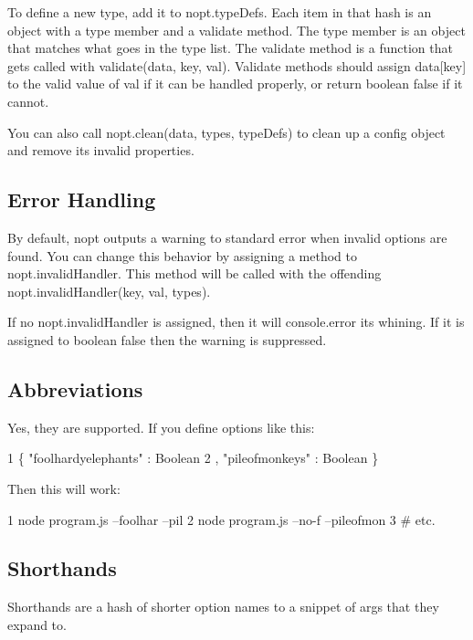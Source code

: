 To define a new type, add it to {\ttfamily nopt.\+type\+Defs}. Each item in that hash is an object with a {\ttfamily type} member and a {\ttfamily validate} method. The {\ttfamily type} member is an object that matches what goes in the type list. The {\ttfamily validate} method is a function that gets called with {\ttfamily validate(data, key, val)}. Validate methods should assign {\ttfamily data\mbox{[}key\mbox{]}} to the valid value of {\ttfamily val} if it can be handled properly, or return boolean {\ttfamily false} if it cannot.

You can also call {\ttfamily nopt.\+clean(data, types, type\+Defs)} to clean up a config object and remove its invalid properties.

\subsection*{Error Handling}

By default, nopt outputs a warning to standard error when invalid options are found. You can change this behavior by assigning a method to {\ttfamily nopt.\+invalid\+Handler}. This method will be called with the offending {\ttfamily nopt.\+invalid\+Handler(key, val, types)}.

If no {\ttfamily nopt.\+invalid\+Handler} is assigned, then it will console.\+error its whining. If it is assigned to boolean {\ttfamily false} then the warning is suppressed.

\subsection*{Abbreviations}

Yes, they are supported. If you define options like this\+:


\begin{DoxyCode}
1 \{ "foolhardyelephants" : Boolean
2 , "pileofmonkeys" : Boolean \}
\end{DoxyCode}


Then this will work\+:


\begin{DoxyCode}
1 node program.js --foolhar --pil
2 node program.js --no-f --pileofmon
3 # etc.
\end{DoxyCode}


\subsection*{Shorthands}

Shorthands are a hash of shorter option names to a snippet of args that they expand to.

